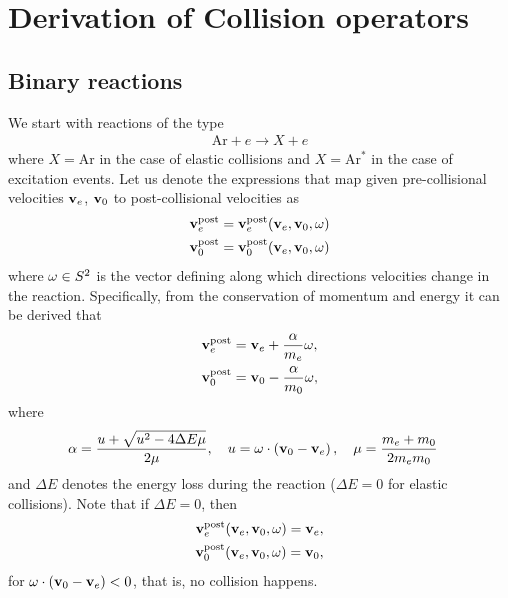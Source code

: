 \documentclass{article}[draft]
\begin{document}




\newpage
\appendix







	
\section{Derivation of Collision operators}

\label{sec:coll_op_derivation}
\subsection{Binary reactions}
\label{subsec:binary_reactions}
We start with reactions of the type
\begin{align*}
\text{Ar} + e \longrightarrow X + e
\end{align*}
where $X = \text{Ar}$ in the case of elastic collisions and $X = \text{Ar}^\ast$ in the case of excitation events. Let us denote the expressions that map given pre-collisional velocities $\mathbf{v}_e$, $\mathbf{v}_0$ to post-collisional velocities as 
\begin{align*}
\vect{v}_e^\text{post} &= \vect{v}_e^\text{post} \of{\vect{v}_e, \vect{v}_0, \vect{\omega}}
\\
\vect{v}_0^\text{post} &= \vect{v}_0^\text{post} \of{\vect{v}_e, \vect{v}_0, \vect{\omega}}
\end{align*} 
where $\mathbf{\omega} \in S^2$ is the vector defining along which directions velocities change in the reaction. Specifically, from the conservation of momentum and energy it can be derived that
\begin{align*}
\mathbf{v}_e^\text{post} &= \mathbf{v}_e + \frac{\alpha}{m_e}\mathbf{\omega},
\\
\mathbf{v}_0^\text{post} &= \mathbf{v}_0 - \frac{\alpha}{m_0}\mathbf{\omega},
\end{align*}
where
\begin{align*}
\alpha &= \frac{u + \sqrt{u^2 - 4 \Delta E \mu}}{2\mu},
\quad 
u = \mathbf{\omega} \cdot \left( \mathbf{v}_0 - \mathbf{v}_e \right),
\quad 
\mu = \frac{m_e+m_0}{2 m_e m_0}
\end{align*}
and $\Delta E$ denotes the energy loss during the reaction ($\Delta E = 0$ for elastic collisions). Note that if $\Delta E=0$, then
\begin{align*}
\vect{v}_e^\text{post} \of{\vect{v}_e, \vect{v}_0, \vect{\omega}} = \vect{v}_e,
\\
\vect{v}_0^\text{post} \of{\vect{v}_e, \vect{v}_0, \vect{\omega}} = \vect{v}_0,
\end{align*} 
for $\mathbf{\omega} \cdot \left( \mathbf{v}_0 - \mathbf{v}_e \right) < 0$, that is, no collision happens.
\end{document}
